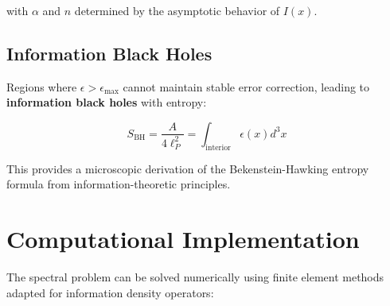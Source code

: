\documentclass[12pt]{article}
\begin{document}
with $\alpha$ and $n$ determined by the asymptotic behavior of $I(x)$.

\subsection{Information Black Holes}

Regions where $\epsilon > \epsilon_{\max}$ cannot maintain stable error correction, leading to \textbf{information black holes} with entropy:

\begin{equation}
S_{\text{BH}} = \frac{A}{4\ell_P^2} = \int_{\text{interior}} \epsilon(x) d^3x
\end{equation}

This provides a microscopic derivation of the Bekenstein-Hawking entropy formula from information-theoretic principles.

\section{Computational Implementation}

The spectral problem can be solved numerically using finite element methods adapted for information density operators:
\end{document}
